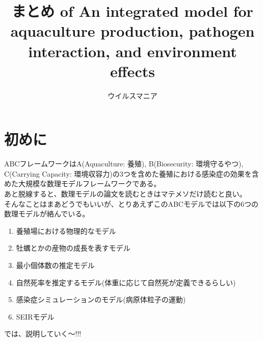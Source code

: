 \documentclass{article}
\title{まとめ of An integrated model for aquaculture production, pathogen interaction, and environment effects}
\author{ウイルスマニア}
\begin{document}
\maketitle

\setlength{\baselineskip}{18pt}

\section*{初めに}
ABCフレームワークはA(Aquaculture: 養殖), B(Biosecurity: 環境守るやつ), C(Carrying Capacity: 環境収容力)の3つを含めた養殖における感染症の効果を含めた大規模な数理モデルフレームワークである。\\
あと脱線すると、数理モデルの論文を読むときはマテメソだけ読むと良い。\\
そんなことはまあどうでもいいが、とりあえずこのABCモデルでは以下の6つの数理モデルが絡んでいる。
\begin{enumerate}
    \item 養殖場における物理的なモデル
    \item 牡蠣とかの産物の成長を表すモデル
    \item 最小個体数の推定モデル
    \item 自然死率を推定するモデル(体重に応じて自然死が定義できるらしい)
    \item 感染症シミュレーションのモデル(病原体粒子の運動)
    \item SEIRモデル
\end{enumerate}
では、説明していく〜!!!
\end{document}
